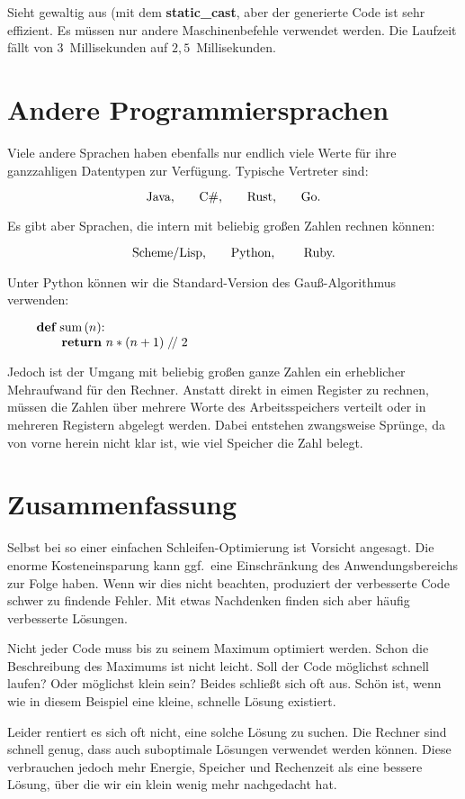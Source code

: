 Sieht gewaltig aus (mit dem {\bf static\_cast}, aber
der generierte Code ist sehr effizient.
Es müssen nur andere Maschinenbefehle verwendet werden.
Die Laufzeit fällt von 3~Millisekunden auf $2{,}5$~Millisekunden.

\section{Andere Programmiersprachen}%
%
Viele andere Sprachen haben ebenfalls nur endlich viele Werte für ihre
ganzzahligen Datentypen zur Verfügung.
Typische Vertreter sind:

$$\hbox{Java,\qquad C\#,\qquad Rust,\qquad Go.}$$

\noindent Es gibt aber Sprachen, die intern mit beliebig großen
Zahlen rechnen können:

$$\hbox{Scheme/Lisp,\qquad Python, \qquad Ruby.}$$

\noindent Unter Python können wir die Standard-Version des Gauß-Algorithmus verwenden:

$$\vbox{\obeylines
{\bf def} sum$\,$($n$):
\qquad {\bf return} $n * (n + 1) \mathrel{/\!/} 2$
}$$

\noindent Jedoch ist der Umgang mit beliebig großen ganze Zahlen
ein erheblicher Mehraufwand für den Rechner.
Anstatt direkt in eimen Register zu rechnen, müssen die
Zahlen über mehrere Worte des Arbeitsspeichers verteilt
oder in mehreren Registern abgelegt werden.
Dabei entstehen zwangsweise Sprünge, da von vorne herein
nicht klar ist, wie viel Speicher die Zahl belegt.

\section{Zusammenfassung}%
%
Selbst bei so einer einfachen Schleifen-Optimierung ist
Vorsicht angesagt.
Die enorme Kosteneinsparung kann ggf.\ eine Einschränkung
des Anwendungsbereichs zur Folge haben.
Wenn wir dies nicht beachten, produziert der verbesserte
Code schwer zu findende Fehler.
Mit etwas Nachdenken finden sich aber häufig verbesserte
Lösungen.

Nicht jeder Code muss bis zu seinem Maximum optimiert
werden.
Schon die Beschreibung des Maximums ist nicht leicht.
Soll der Code möglichst schnell laufen?
Oder möglichst klein sein?
Beides schließt sich oft aus.
Schön ist, wenn wie in diesem Beispiel eine kleine,
schnelle Lösung existiert.

Leider rentiert es sich oft nicht, eine solche Lösung
zu suchen.
Die Rechner sind schnell genug, dass auch suboptimale
Lösungen verwendet werden können.
Diese verbrauchen jedoch mehr Energie, Speicher und
Rechenzeit als eine bessere Lösung, über die wir ein
klein wenig mehr nachgedacht hat.

